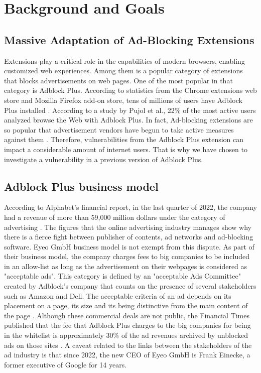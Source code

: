 \documentclass[conference]{IEEEtran}
\begin{document}
\section{Background and Goals}
\subsection{Massive Adaptation of Ad-Blocking Extensions}
Extensions play a critical role in the capabilities of modern browsers, enabling customized web experiences. Among them is a popular category of extensions that blocks advertisements on web pages. One of the most popular in that category is Adblock Plus. According to statistics from the Chrome extensions web store and Mozilla Firefox add-on store, tens of millions of users have Adblock Plus installed \cite{noauthor_adblockchrome_nodate, noauthor_adblockfirefox_nodate}. According to a study by Pujol et al., 22\% of the most active users analyzed browse the Web with Adblock Plus. In fact, Ad-blocking extensions are so popular that advertisement vendors have begun to take active measures against them \cite{mughees_first_2016}. Therefore, vulnerabilities from the Adblock Plus extension can impact a considerable amount of internet users. That is why we have chosen to investigate a vulnerability in a previous version of Adblock Plus.

\subsection{Adblock Plus business model}
According to Alphabet's financial report, in the last quarter of 2022, the company had a revenue of more than 59,000 million dollars under the category of advertising \cite{alphabet_revenue}. The figures that the online advertising industry manages show why there is a fierce fight between publisher of contents, ad networks and ad-blocking software. Eyeo GmbH business model is not exempt from this dispute. As part of their business model, the company charges fees to big companies to be included in an allow-list as long as the advertisement on their webpages is considered as "acceptable ads". This category is defined by an "acceptable Ads Committee" created by Adblock's company that counts on the presence of several stakeholders such as Amazon and Dell. The acceptable criteria of an ad depends on its placement on a page, its size and its being distinctive from the main content of the page \cite{acceptable_ads}. Although these commercial deals are not public, the Financial Times published that the fee that Adblock Plus charges to the big companies for being in the whitelist is approximately 30\% of the ad revenues archived by unblocked ads on those sites \cite{financial_times}. 
A caveat related to the links between the stakeholders of the ad industry is that since 2022, the new CEO of Eyeo GmbH is Frank Einecke, a former executive of Google for 14 years.
\end{document}
